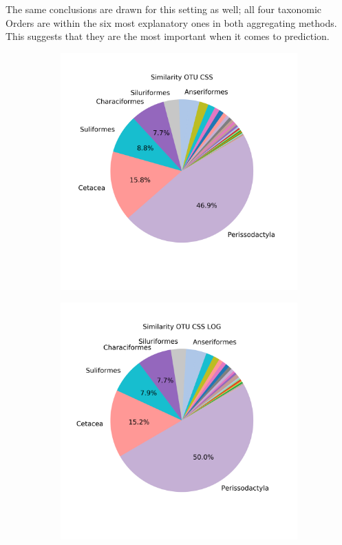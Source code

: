 The same conclusions are drawn for this setting as well; all four taxonomic Orders are within the six most explanatory ones in both aggregating methods. This suggests that they are the most important when it comes to prediction.
\begin{figure}[!htb]
	\centering
	\begin{subfigure}{0.45\textwidth}
		\includegraphics[width=\textwidth]{rfr_dis_mean_pieOTU CSS}
		\caption{}
		\label{fig:dissimotucss}
	\end{subfigure}
	\begin{subfigure}{0.45\textwidth}
		\includegraphics[width=\textwidth]{rfr_dis_mean_pieOTU CSS LOG}

\end{subfigure}
\end{figure}
